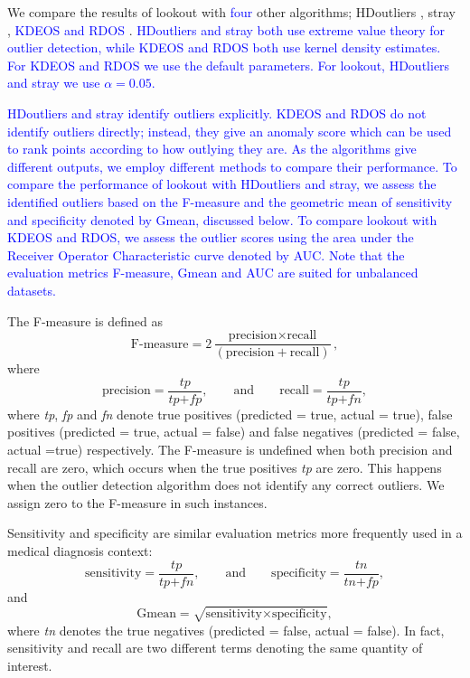 \documentclass[12pt]{article}
\theoremstyle{definition}
\theoremstyle{definition}
\theoremstyle{definition}
\theoremstyle{definition}
\theoremstyle{remark}
\begin{document}
We compare the results of lookout with \textcolor{blue}{four} other algorithms; HDoutliers \citep{wilkinson2017visualizing}, stray \citep{stray}, \textcolor{blue}{KDEOS} \citep{Schubert2014} \textcolor{blue}{ and RDOS} \citep{Tang2017}. \textcolor{blue}{HDoutliers and stray both use extreme value theory for outlier detection, while KDEOS and RDOS both use kernel density estimates. For KDEOS and RDOS we use the default parameters. For lookout, HDoutliers and stray we use $\alpha = 0.05$.}

\textcolor{blue}{HDoutliers and stray identify outliers explicitly. KDEOS and RDOS do not identify outliers directly; instead, they give an anomaly score which can be used to rank points according to how outlying they are. As the algorithms give different outputs, we employ different methods to compare their performance. To compare the performance of lookout with HDoutliers and stray, we assess the identified outliers based on the F-measure and the geometric mean of sensitivity and specificity denoted by Gmean, discussed below. To compare lookout with KDEOS and RDOS, we assess the outlier scores using the area under the Receiver Operator Characteristic curve denoted by AUC. Note that the evaluation metrics F-measure, Gmean and AUC are suited for unbalanced datasets.}

The F-measure is defined as
\begin{equation}\label{eq:fmeasure}
    \text{F-measure} = 2\frac{\text{precision} \times \text{recall}}{\left( \text{precision} + \text{recall} \right) }  ,
\end{equation}
where
\begin{equation}\label{eq:pr}
    \text{precision} = \frac{ \textit{tp} }{\textit{tp} + \textit{fp}}  , \qquad \text{and} \qquad \text{recall} = \frac{\textit{tp}}{\textit{tp} + \textit{fn}}  ,
\end{equation}
where \emph{tp}, \emph{fp} and \emph{fn} denote true positives (predicted = true, actual = true), false positives (predicted = true, actual = false) and false negatives (predicted = false, actual =true) respectively. The F-measure is undefined when both precision and recall are zero, which occurs when the true positives \emph{tp} are zero. This happens when the outlier detection algorithm does not identify any correct outliers. We assign zero to the F-measure in such instances.

Sensitivity and specificity are similar evaluation metrics more frequently used in a medical diagnosis context:
\begin{equation}\label{eq:ss}
    \text{sensitivity} = \frac{ \textit{tp} }{\textit{tp} + \textit{fn}}  , \qquad \text{and} \qquad \text{specificity} = \frac{\textit{tn}}{\textit{tn} + \textit{fp}}  ,
\end{equation}
and
\begin{equation}\label{eq:gmean}
    \text{Gmean} = \sqrt{ \text{sensitivity} \times \text{specificity}}  ,
\end{equation}
where \emph{tn} denotes the true negatives (predicted = false, actual = false). In fact, sensitivity and recall are two different terms denoting the same quantity of interest.
\end{document}
